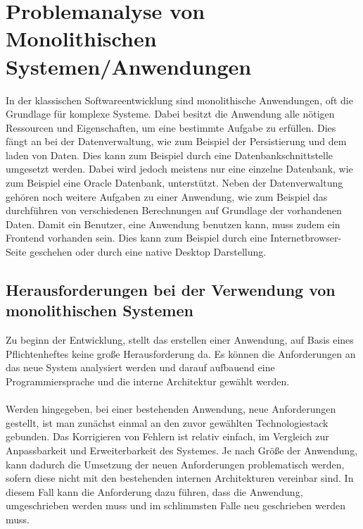 \chapter{Problemanalyse von Monolithischen Systemen/Anwendungen}
\label{chap:ProblemanalyseMonolithischeSysteme}
In der klassischen Softwareentwicklung sind monolithische Anwendungen, oft die Grundlage für komplexe Systeme. Dabei besitzt die Anwendung alle nötigen Ressourcen und Eigenschaften, um eine bestimmte Aufgabe zu erfüllen. Dies fängt an bei der Datenverwaltung, wie zum Beispiel der Persistierung und dem laden von Daten. Dies kann zum Beispiel durch eine Datenbankschnittstelle umgesetzt werden. Dabei wird jedoch meistens nur eine einzelne Datenbank, wie zum Beispiel eine Oracle Datenbank, unterstützt. Neben der Datenverwaltung gehören noch weitere Aufgaben zu einer Anwendung, wie zum Beispiel das durchführen von verschiedenen Berechnungen auf Grundlage der vorhandenen Daten. Damit ein Benutzer, eine Anwendung benutzen kann, muss zudem ein Frontend vorhanden sein. Dies kann zum Beispiel durch eine Internetbrowser-Seite geschehen oder durch eine native Desktop Darstellung.



\section{Herausforderungen bei der Verwendung von monolithischen Systemen}
\label{sec:HerausforderungenMonolithisch}
Zu beginn der Entwicklung, stellt das erstellen einer Anwendung, auf Basis eines Pflichtenheftes keine große Herausforderung da. Es können die Anforderungen an das neue System analysiert werden und darauf aufbauend eine Programmiersprache und die interne Architektur gewählt werden.
\\\\
Werden hingegeben, bei einer bestehenden Anwendung, neue Anforderungen gestellt, ist man zunächst einmal an den zuvor gewählten Technologiestack gebunden. Das Korrigieren von Fehlern ist relativ einfach, im Vergleich zur Anpassbarkeit und Erweiterbarkeit des Systemes. Je nach Größe der Anwendung, kann dadurch die Umsetzung der neuen Anforderungen problematisch werden, sofern diese nicht mit den bestehenden internen Architekturen vereinbar sind. In diesem Fall kann die Anforderung dazu führen, dass die Anwendung, umgeschrieben werden muss und im schlimmsten Falle neu geschrieben werden muss.

